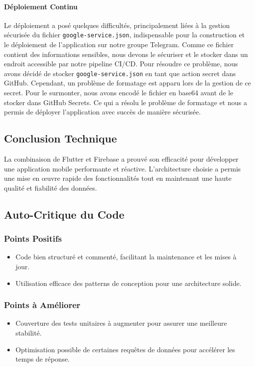 \paragraph{Déploiement Continu} Le déploiement a posé quelques difficultés, principalement liées à la gestion sécurisée du fichier \texttt{google-service.json}, indispensable pour la construction et le déploiement de l'application sur notre groupe Telegram. Comme ce fichier contient des informations sensibles, nous devons le sécuriser et le stocker dans un endroit accessible par notre pipeline CI/CD. Pour résoudre ce problème, nous avons décidé de stocker \texttt{google-service.json} en tant que action secret dans GitHub. Cependant, un problème de formatage est apparu lors de la gestion de ce secret. Pour le surmonter, nous avons encodé le fichier en base64 avant de le stocker dans GitHub Secrets. Ce qui a résolu le problème de formatage et nous a permis de déployer l'application avec succès de manière sécurisée.



\subsection{Conclusion Technique}

La combinaison de Flutter et Firebase a prouvé son efficacité pour développer une application mobile performante et réactive. L'architecture choisie a permis une mise en œuvre rapide des fonctionnalités tout en maintenant une haute qualité et fiabilité des données.

\subsection{Auto-Critique du Code}

\subsubsection{Points Positifs}
\begin{itemize}
    \item Code bien structuré et commenté, facilitant la maintenance et les mises à jour.
    \item Utilisation efficace des patterns de conception pour une architecture solide.
\end{itemize}

\subsubsection{Points à Améliorer}
\begin{itemize}
    \item Couverture des tests unitaires à augmenter pour assurer une meilleure stabilité.
    \item Optimisation possible de certaines requêtes de données pour accélérer les temps de réponse.
\end{itemize}